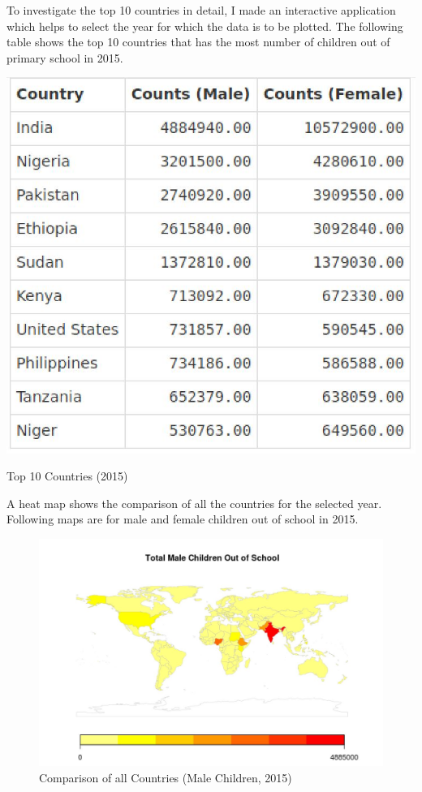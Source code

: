 \documentclass{article}
\begin{document}
To investigate the top 10 countries in detail, I made an interactive application which helps to select the year for which the data is to be plotted. The following table shows the top 10 countries  that has the most number of children out of primary school in 2015.

\begin{table}[H]
  \centering
    \includegraphics[scale=1]{Top102015}
  \caption{Top 10 Countries (2015)}
\end{table}

A heat map shows the comparison of all the countries for the selected year. Following maps are for male and female children out of school in 2015.

\begin{figure}[H]
  \centering
    \includegraphics[scale=0.9]{MaleMap}
  \caption{Comparison of all Countries (Male Children, 2015)}
\end{figure}
\end{document}
